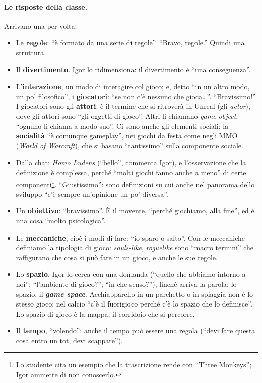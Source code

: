 \paragraph{Le risposte della classe.} Arrivano una per volta.
\begin{itemize}
  \item Le \textbf{regole}: ``è formato da una serie di regole''. ``Bravo, regole.''
        Quindi una struttura.
  \item Il \textbf{divertimento}. Igor lo ridimensiona: il divertimento è ``una
        conseguenza''.
  \item L'\textbf{interazione}, un modo di interagire col gioco; e, detto ``in un
        altro modo, un po' filosofico'', i \textbf{giocatori}: ``se non c'è nessuno
        che gioca\ldots''. ``Bravissimo!'' I giocatori sono gli
        \textbf{attori}: è il termine che si ritroverà in Unreal (gli
        \emph{actor}), dove gli attori sono ``gli oggetti di gioco''. Altri li chiamano
        \emph{game object}, ``ognuno li chiama a modo suo''. Ci sono anche gli
        elementi sociali: la \textbf{socialità} ``è comunque gameplay'', nei giochi da
        festa come negli MMO (\emph{World of Warcraft}), che si basano ``tantissimo''
        sulla componente sociale.
  \item Dalla chat: \emph{Homo Ludens} (``bello'', commenta Igor), e l'osservazione che
        la definizione è complessa, perché ``molti giochi fanno anche a meno'' di
        certe componenti\footnote{Lo studente cita un esempio che la trascrizione rende
        con ``Three Monkeys''; Igor ammette di non conoscerlo.}. ``Giustissimo'': sono
        definizioni su cui anche nel panorama dello sviluppo ``c'è sempre un'opinione
        un po' diversa''.
  \item Un \textbf{obiettivo}: ``bravissimo''. È il movente, ``perché giochiamo, alla
        fine'', ed è una cosa ``molto psicologica''.
  \item Le \textbf{meccaniche}, cioè i modi di fare: ``io sparo o salto''. Con le
        meccaniche definiamo la tipologia di gioco: \emph{souls-like},
        \emph{roguelike} sono ``macro termini'' che raffigurano che cosa si può fare in
        un gioco, e anche le sue regole.
  \item Lo \textbf{spazio}. Igor lo cerca con una domanda (``quello che abbiamo intorno
        a noi''; ``l'ambiente di gioco?''; ``in che senso?''), finché arriva la
        parola: lo spazio, il \textbf{\emph{game space}}. Acchiapparello in un
        parchetto o in spiaggia non è lo stesso gioco; nel calcio ``c'è il fuorigioco
        perché c'è lo spazio che lo definisce''. Lo spazio di gioco è la mappa, il
        corridoio che si percorre.
  \item Il \textbf{tempo}, ``volendo'': anche il tempo può essere una regola (``devi
        fare questa cosa entro un tot, devi scappare'').
\end{itemize}

